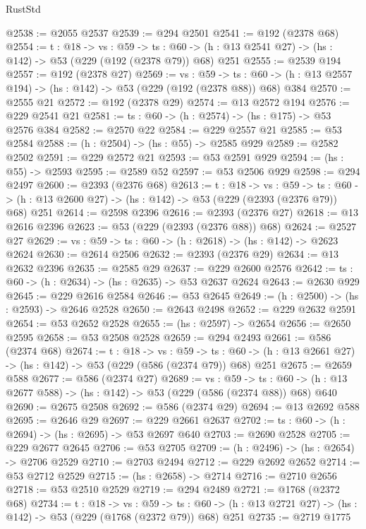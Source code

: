 \begin{lexlean}{RustStd}
\begin{coremodule}
@2538 := @2055 @2537
@2539 := @294 @2501
@2541 := @192 (@2378 @68)
@2554 := {t : @18} ->
  {vs : @59} ->
  {ts : @60} -> (h : @13 @2541 @27) -> (hs : @142) -> @53 (@229 (@192 (@2378 @79)) @68) @251
@2555 := @2539 @194
@2557 := @192 (@2378 @27)
@2569 := {vs : @59} ->
  {ts : @60} -> (h : @13 @2557 @194) -> (hs : @142) -> @53 (@229 (@192 (@2378 @88)) @68) @384
@2570 := @2555 @21
@2572 := @192 (@2378 @29)
@2574 := @13 @2572 @194
@2576 := @229 @2541 @21
@2581 := {ts : @60} -> (h : @2574) -> (hs : @175) -> @53 @2576 @384
@2582 := @2570 @22
@2584 := @229 @2557 @21
@2585 := @53 @2584
@2588 := (h : @2504) -> (hs : @55) -> @2585 @929
@2589 := @2582 @2502
@2591 := @229 @2572 @21
@2593 := @53 @2591 @929
@2594 := (hs : @55) -> @2593
@2595 := @2589 @52
@2597 := @53 @2506 @929
@2598 := @294 @2497
@2600 := @2393 (@2376 @68)
@2613 := {t : @18} ->
  {vs : @59} ->
  {ts : @60} -> (h : @13 @2600 @27) -> (hs : @142) -> @53 (@229 (@2393 (@2376 @79)) @68) @251
@2614 := @2598 @2396
@2616 := @2393 (@2376 @27)
@2618 := @13 @2616 @2396
@2623 := @53 (@229 (@2393 (@2376 @88)) @68)
@2624 := @2527 @27
@2629 := {vs : @59} -> {ts : @60} -> (h : @2618) -> (hs : @142) -> @2623 @2624
@2630 := @2614 @2506
@2632 := @2393 (@2376 @29)
@2634 := @13 @2632 @2396
@2635 := @2585 @29
@2637 := @229 @2600 @2576
@2642 := {ts : @60} -> (h : @2634) -> (hs : @2635) -> @53 @2637 @2624
@2643 := @2630 @929
@2645 := @229 @2616 @2584
@2646 := @53 @2645
@2649 := (h : @2500) -> (hs : @2593) -> @2646 @2528
@2650 := @2643 @2498
@2652 := @229 @2632 @2591
@2654 := @53 @2652 @2528
@2655 := (hs : @2597) -> @2654
@2656 := @2650 @2595
@2658 := @53 @2508 @2528
@2659 := @294 @2493
@2661 := @586 (@2374 @68)
@2674 := {t : @18} ->
  {vs : @59} ->
  {ts : @60} -> (h : @13 @2661 @27) -> (hs : @142) -> @53 (@229 (@586 (@2374 @79)) @68) @251
@2675 := @2659 @588
@2677 := @586 (@2374 @27)
@2689 := {vs : @59} ->
  {ts : @60} -> (h : @13 @2677 @588) -> (hs : @142) -> @53 (@229 (@586 (@2374 @88)) @68) @640
@2690 := @2675 @2508
@2692 := @586 (@2374 @29)
@2694 := @13 @2692 @588
@2695 := @2646 @29
@2697 := @229 @2661 @2637
@2702 := {ts : @60} -> (h : @2694) -> (hs : @2695) -> @53 @2697 @640
@2703 := @2690 @2528
@2705 := @229 @2677 @2645
@2706 := @53 @2705
@2709 := (h : @2496) -> (hs : @2654) -> @2706 @2529
@2710 := @2703 @2494
@2712 := @229 @2692 @2652
@2714 := @53 @2712 @2529
@2715 := (hs : @2658) -> @2714
@2716 := @2710 @2656
@2718 := @53 @2510 @2529
@2719 := @294 @2489
@2721 := @1768 (@2372 @68)
@2734 := {t : @18} ->
  {vs : @59} ->
  {ts : @60} -> (h : @13 @2721 @27) -> (hs : @142) -> @53 (@229 (@1768 (@2372 @79)) @68) @251
@2735 := @2719 @1775

\end{coremodule}
\end{lexlean}
